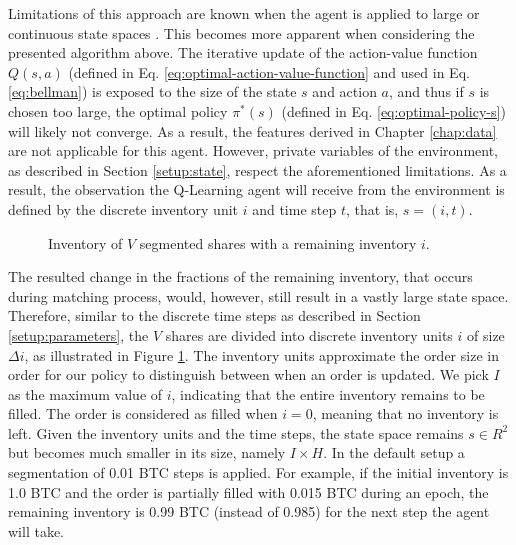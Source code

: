 Limitations of this approach are known when the agent is applied to large or continuous state spaces \cite{gaskett2002q}.
This becomes more apparent when considering the presented algorithm above.
The iterative update of the action-value function $Q(s,a)$ (defined in Eq. \ref{eq:optimal-action-value-function} and used in Eq. \ref{eq:bellman}) is exposed to the size of the state $s$ and action $a$, and thus if $s$ is chosen too large, the optimal policy $\pi^*(s)$ (defined in Eq. \ref{eq:optimal-policy-s}) will likely not converge.
As a result, the features derived in Chapter \ref{chap:data} are not applicable for this agent.
However, private variables of the environment, as described in Section \ref{setup:state}, respect the aforementioned limitations.
As a result, the observation the Q-Learning agent will receive from the environment is defined by the discrete inventory unit $i$ and time step $t$, that is, $s=(i, t)$.
\begin{figure}[H]
    \centering
    \caption{Inventory of $V$ segmented shares with a remaining inventory $i$.}
    \label{fig:setup-inventory}
\end{figure}
The resulted change in the fractions of the remaining inventory, that occurs during matching process, would, however,  still result in a vastly large state space.
Therefore, similar to the discrete time steps as described in Section \ref{setup:parameters}, the $V$ shares are divided into discrete inventory units $i$ of size $\Delta{i}$, as illustrated in Figure \ref{fig:setup-inventory}.
The inventory units approximate the order size in order for our policy to distinguish between when an order is updated.
We pick $I$ as the maximum value of $i$, indicating that the entire inventory remains to be filled.
The order is considered as filled when $i=0$, meaning that no inventory is left.
Given the inventory units and the time steps, the state space remains $s \in R^2$ but becomes much smaller in its size, namely $I \times H$.
In the default setup a segmentation of 0.01 BTC steps is applied.
For example, if the initial inventory is 1.0 BTC and the order is partially filled with 0.015 BTC during an epoch, the remaining inventory is 0.99 BTC (instead of 0.985) for the next step the agent will take.

